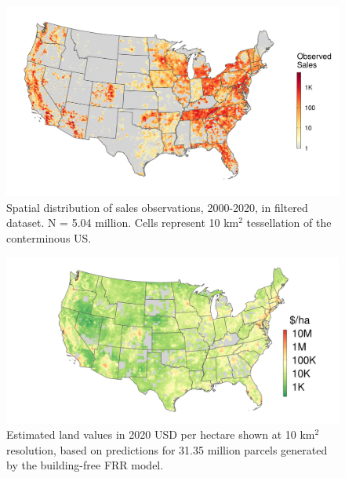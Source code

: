 \documentclass[12pt]{article}
\begin{document}
\begin{figure}[H]
    \centering
    \includegraphics[width=1\textwidth]{exhibits/clean_obs_density.png}
    \caption{Spatial distribution of sales observations, 2000-2020, in filtered dataset. N = 5.04 million. Cells represent 10 km$^2$ tessellation of the conterminous US.}
    \label{fig:clean_obs_density}
\end{figure}

\begin{figure}[H]
    \centering
    \includegraphics[width=1\textwidth]{output/exhibits/ffb_pred_all_parcels.png}
    \caption{Estimated land values in 2020 USD per hectare shown at 10 km$^2$ resolution, based on predictions for 31.35 million parcels generated by the building-free FRR model.}
    \label{fig:ffb_pred_all_parcels}
\end{figure}
\end{document}
